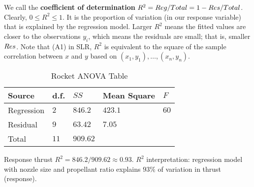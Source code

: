 We call the \textbf{coefficient of determination}
$ R^2 = \relax{Reg}/\relax{Total}=1-\relax{Res}/\relax{Total} $.
Clearly, $ 0\leqslant R^2\leqslant 1 $. It is the proportion
of variation (in our response variable) that is explained
by the regression model. Larger $ R^2 $ means
the fitted values are closer to the observations $ y_i $,
which means the residuals are small; that is, smaller $ \relax{Res} $.
Note that (A1) in SLR, $ R^2 $ is equivalent to the square of
the sample correlation between $ x $ and $ y $
based on $ (x_1,y_1),\ldots,(x_n,y_n) $.

\begin{table}[H]
    \centering
    \caption{Rocket ANOVA Table}
    \begin{tabularx}{\linewidth}{@{}YYYYY@{}}
        \toprule
        Source     & d.f.   & $ SS $     & Mean Square & $ F $  \\
        \midrule
        Regression & $ 2 $  & $ 846.2 $  & $ 423.1 $   & $ 60 $ \\
        Residual   & $ 9 $  & $ 63.42 $  & $ 7.05 $    &        \\
        \midrule
        Total      & $ 11 $ & $ 909.62 $                        \\
        \bottomrule
    \end{tabularx}
\end{table}
Response thrust
$ R^2=846.2/909.62 \approx 0.93 $. $ R^2 $
interpretation: regression model with nozzle size and propellant ratio
explains $ 93\% $ of variation in thrust (response).
